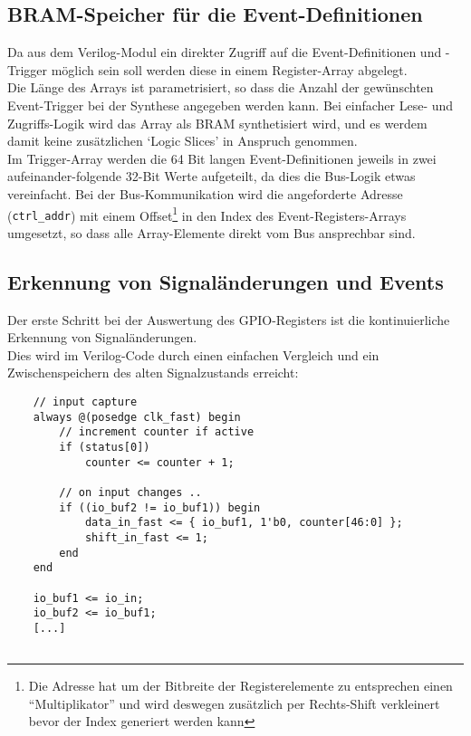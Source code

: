 {\subsection{BRAM-Speicher für die Event-Definitionen}

Da aus dem Verilog-Modul ein direkter Zugriff auf die Event-Definitionen und -Trigger möglich sein soll werden diese in einem Register-Array abgelegt.\\
Die Länge des Arrays ist parametrisiert, so dass die Anzahl der gewünschten Event-Trigger bei der Synthese angegeben werden kann. Bei einfacher Lese- und Zugriffs-Logik wird das Array als BRAM synthetisiert wird, und es werdem damit keine zusätzlichen `Logic Slices' in Anspruch genommen.\\  
Im Trigger-Array werden die 64 Bit langen Event-Definitionen jeweils in zwei aufeinander-folgende 32-Bit Werte aufgeteilt, da dies die Bus-Logik etwas vereinfacht.  
Bei der Bus-Kommunikation wird die angeforderte Adresse ({\tt ctrl\_addr}) mit einem Offset\footnote{Die Adresse hat um der Bitbreite der Registerelemente zu entsprechen einen ``Multiplikator'' und wird deswegen zusätzlich per Rechts-Shift verkleinert bevor der Index generiert werden kann} in den Index des Event-Registers-Arrays umgesetzt, so dass alle Array-Elemente direkt vom Bus ansprechbar sind. 

\subsection{Erkennung von Signaländerungen und Events}

Der erste Schritt bei der Auswertung des GPIO-Registers ist die kontinuierliche Erkennung von Signaländerungen.\\
Dies wird im Verilog-Code durch einen einfachen Vergleich und ein Zwischenspeichern des alten Signalzustands erreicht:

\begin{verbatim}
	// input capture
	always @(posedge clk_fast) begin
		// increment counter if active
		if (status[0])  
			counter <= counter + 1;
		
		// on input changes ..
		if ((io_buf2 != io_buf1)) begin
			data_in_fast <= { io_buf1, 1'b0, counter[46:0] };
			shift_in_fast <= 1;
		end
	end
	
	io_buf1 <= io_in;
	io_buf2 <= io_buf1;	
	[...]


\end{verbatim}}
